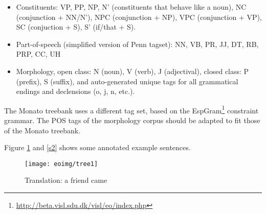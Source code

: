\documentclass[10pt,a4paper]{article}
\begin{document}
\begin{itemize}
\item Constituents: VP, PP, NP, N' (constituents that behave like a noun), 
NC (conjunction + NN/N'), NPC (conjunction + NP), VPC (conjunction + VP), 
SC (conjuction + S), S' (if/that + S). 
\item Part-of-speech (simplified version of Penn tagset): NN, VB, PR, JJ, DT, RB, PRP, CC, UH
\item Morphology, open class: N (noun), V (verb), J (adjectival), 
closed class: P (prefix), S (suffix), and auto-generated unique tags for
all grammatical endings and declensions (o, j, n, etc.).
\end{itemize}

The Monato treebank uses a different tag set, based on the 
EspGram\footnote{\url{http://beta.visl.sdu.dk/visl/eo/index.php}} constraint
grammar. The POS tags of the morphology corpus should be adapted to fit those
of the Monato treebank.

Figure \ref{s1} and \ref{s2} shows some annotated example sentences.


\begin{figure}
\centering
\texttt{[image: eoimg/tree1]}
\caption{Translation: a friend came}
\label{s1}
\end{figure}

\begin{comment}
\begin{verbatim}
(S (S (NP (DT la) (N' (JJ venontajn) (N' (JJ apartajn) (NN pecojn)))) 
(VP (NP (PRP mi)) (VP (VBP donas)))) (S' (IN ke) (S (NP (DT la) (NN lernantoj)) 
(VP (VB povu) (VP (VP (VP (VB ripeti) (RB praktike)) (NP (NP (DT la) (NN regulojn)) 
(PP (IN de) (NP (DT l') (N' (NN gramatiko) (JJ internacia)))))) 
(VPC (CC kaj) (VP (VP (VB kompreni) (RB bone)) (NP (NP (NP (DT la) (NN signifon)) 
(NPC (CC kaj) (NP (DT la) (NN uzon)))) (PP (IN de) 
(NP (DT l') (N' (NN sufiksoj) (NC (CC kaj) (NN prefiksoj)))))))))))))
\end{verbatim}
\end{comment}
\end{document}
